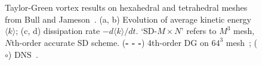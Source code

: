 \begin{figure}[htbp]
\centering
{}
\\
\\
\caption{\small Taylor-Green vortex results on hexahedral and tetrahedral meshes from Bull and Jameson~\cite{bull2014a}.
(a, b) Evolution of average kinetic energy $\langle k \rangle$; (c, d) dissipation rate $-d \langle k \rangle/dt$.
`SD-$M \times N$' refers to $M^3$ mesh, $N$th-order accurate SD scheme.
(\textbf{- - -}) 4th-order DG on $64^3$ mesh~\cite{beck:12}; ($\circ$) DNS~\cite{debonis:13}.}
\label{dissrate}
\end{figure}

